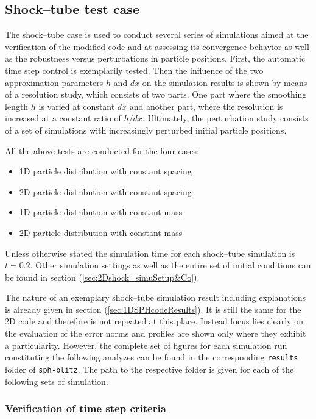 \documentclass{report}
\begin{document}
\subsection{Shock--tube test case}
\label{sec:2DSPHcodeResults_Shock}
The shock--tube case is used to conduct several series of simulations aimed at the verification of the modified code and at assessing its convergence behavior %
as well as the robustness versus perturbations in particle positions. 
First, the automatic time step control is exemplarily tested. Then the influence of the two approximation parameters $h$ and $dx$ on the simulation results is shown by means of a resolution study, which consists of two parts. One part where the smoothing length $h$ is varied at constant $dx$ and another part, where the resolution is increased at a constant ratio of $h/dx$. Ultimately, the perturbation study consists of a set of simulations with increasingly perturbed initial particle positions.

All the above tests are conducted for the four cases:
\begin{itemize}
 \item 1D particle distribution with constant spacing
  \item 2D particle distribution with constant spacing
 \item 1D particle distribution with constant mass
  \item 2D particle distribution with constant mass
\end{itemize}

Unless otherwise stated the simulation time for each shock--tube simulation is $t=0.2$. Other simulation settings as well as the entire set of initial conditions can be found in section (\ref{sec:2Dshock_simuSetup&Co}).

The nature of an exemplary shock--tube simulation result including explanations is already given in section (\ref{sec:1DSPHcodeResults}). It is still the same for the 2D code and therefore is not repeated at this place. Instead focus lies clearly on the evaluation of the error norms and profiles are shown only where they exhibit a particularity. However, the complete set of figures for each simulation run constituting the following analyzes can be found in the corresponding {\tt results} folder of {\tt sph-blitz}. The path to the respective folder is given for each of the following sets of simulation.

\subsubsection{Verification of time step criteria}
\end{document}
